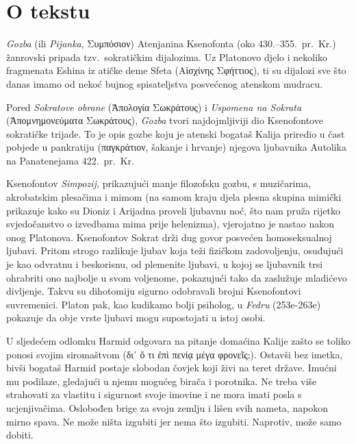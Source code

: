 

\section*{O tekstu}

\textit{Gozba} (ili \textit{Pijanka}, \textgreek[variant=ancient]{Συμπόσιον)} Atenjanina Ksenofonta (oko 430.–355.\ pr.~Kr.) žanrovski pripada tzv.\ sokratičkim dijalozima. Uz Platonovo djelo i nekoliko fragmenata Eshina iz atičke deme Sfeta \textgreek[variant=ancient]{(Αἰσχίνης Σφήττιος),} ti su dijalozi sve što danas imamo od nekoć bujnog spisateljstva posvećenog atenskom mudracu. 

Pored \textit{Sokratove obrane} \textgreek[variant=ancient]{(Ἀπολογία Σωκράτους)} i \textit{Uspomena na Sokrata} \textgreek[variant=ancient]{(Ἀπομνημονεύματα Σωκράτους),} \textit{Gozba} tvori najdojmljiviji dio Ksenofontove sokratičke trijade. To je opis gozbe koju je atenski bogataš Kalija priredio u čast pobjede u pankratiju \textgreek[variant=ancient]{(παγκράτιον,} šakanje i hrvanje) njegova ljubavnika Autolika na Panatenejama 422.\ pr.~Kr. 

Ksenofontov \textit{Simpozij,} prikazujući manje filozofsku gozbu, s muzičarima, akrobatskim plesačima i mimom (na samom kraju djela plesna skupina mimički prikazuje kako su Dioniz i Arijadna proveli ljubavnu noć, što nam pruža rijetko svjedočanstvo o izvedbama mima prije helenizma), vjerojatno je nastao nakon onog Platonova. Ksenofontov Sokrat drži dug govor posvećen homoseksualnoj ljubavi. Pritom strogo razlikuje ljubav koja teži fizičkom zadovoljenju, osuđujući je kao odvratnu i beskorisnu, od plemenite ljubavi, u kojoj se ljubavnik trsi ohrabriti ono najbolje u svom voljenome, pokazujući tako da zaslužuje mladićevo divljenje. Takvu su dihotomiju sigurno odobravali brojni Ksenofontovi suvremenici. Platon pak, kao kudikamo bolji psiholog, u \textit{Fedru} (253e-263e) pokazuje da obje vrste ljubavi mogu supostojati u istoj osobi. 

U sljedećem odlomku Harmid odgovara na pitanje domaćina Kalije zašto se toliko ponosi svojim siromaštvom \textgreek[variant=ancient]{(δι᾿ ὅ τι ἐπὶ πενίᾳ μέγα φρονεῖς;).} Ostavši bez imetka, bivši bogataš Harmid postaje slobodan čovjek koji živi na teret države. Imućni mu podilaze, gledajući u njemu mogućeg birača i porotnika. Ne treba više strahovati za vlastitu i sigurnost svoje imovine i ne mora imati posla s ucjenjivačima. Oslobođen brige za svoju zemlju i lišen svih nameta, napokon mirno spava. Ne može ništa izgubiti jer nema što izgubiti. Naprotiv, može samo dobiti.

